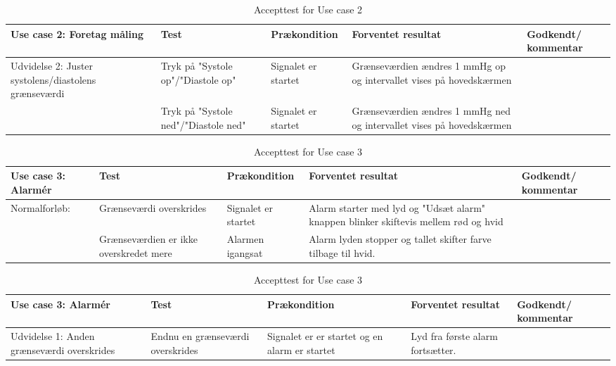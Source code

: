 \begin{table}[H]
\caption{Accepttest for Use case 2}\label{tab:tabel12}
\begin{tabular}{|>{\raggedright\arraybackslash}p{2.5cm}| >{\raggedright\arraybackslash}p{2.9cm} | >{\raggedright\arraybackslash}p{2.9cm} | >{\raggedright\arraybackslash}p{2.9cm} | >{\raggedright\arraybackslash}p{2.8cm} |}
   \hline
   \textbf{Use case 2: Foretag måling } &\textbf{Test}& \textbf{Prækondition} & \textbf{Forventet resultat} & \textbf{Godkendt/ kommentar}\\ \hline
   Udvidelse 2: Juster systolens/diastolens grænseværdi& Tryk på "Systole op"/"Diastole op"& Signalet er startet & Grænseværdien ændres 1 mmHg op og intervallet vises på hovedskærmen &\\\hline
   &Tryk på "Systole ned"/"Diastole ned" & Signalet er startet & Grænseværdien ændres 1 mmHg ned og intervallet vises på hovedskærmen & \\\hline
\end{tabular}
\end{table}



\begin{table}[H]
\caption{Accepttest for Use case 3}\label{tab:tabel13}
\begin{tabular}{|>{\raggedright\arraybackslash}p{2.5cm}| >{\raggedright\arraybackslash}p{2.9cm} | >{\raggedright\arraybackslash}p{2.9cm} | >{\raggedright\arraybackslash}p{2.9cm} | >{\raggedright\arraybackslash}p{2.8cm} |}
   \hline
   \textbf{Use case 3: Alarmér } &\textbf{Test}& \textbf{Prækondition} & \textbf{Forventet resultat} & \textbf{Godkendt/ kommentar}\\ \hline
   Normalforløb:& Grænseværdi overskrides& Signalet er startet & Alarm starter med lyd og "Udsæt alarm" knappen blinker skiftevis mellem rød og hvid &\\\hline
   & Grænseværdien er ikke overskredet mere & Alarmen igangsat & Alarm lyden stopper og tallet skifter farve tilbage til hvid. & \\\hline
\end{tabular}
\end{table}



\begin{table}[H]
\caption{Accepttest for Use case 3}\label{tab:tabel14}
\begin{tabular}{|>{\raggedright\arraybackslash}p{2.5cm}| >{\raggedright\arraybackslash}p{2.9cm} | >{\raggedright\arraybackslash}p{2.9cm} | >{\raggedright\arraybackslash}p{2.9cm} | >{\raggedright\arraybackslash}p{2.8cm} |}
   \hline
   \textbf{Use case 3: Alarmér } &\textbf{Test}& \textbf{Prækondition} & \textbf{Forventet resultat} & \textbf{Godkendt/ kommentar}\\ \hline
   Udvidelse 1: Anden grænseværdi overskrides & Endnu en grænseværdi overskrides & Signalet er er startet og en alarm er startet & Lyd fra første alarm fortsætter. &\\\hline
\end{tabular}
\end{table}



